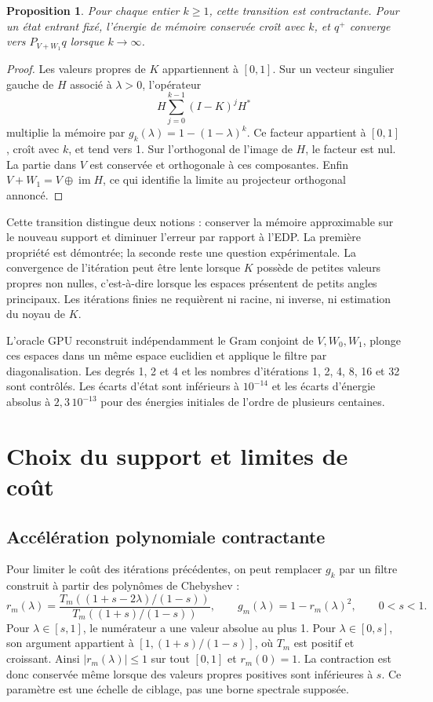 \documentclass[11pt,a4paper]{article}
\newtheorem{proposition}{Proposition}
\begin{document}
\begin{proposition}
Pour chaque entier $k\geq1$, cette transition est contractante.
Pour un état entrant fixé, l'énergie de mémoire conservée croît avec
$k$, et $q^+$ converge vers $P_{V+W_1}q$ lorsque $k\to\infty$.
\end{proposition}
\begin{proof}
Les valeurs propres de $K$ appartiennent à $[0,1]$. Sur un vecteur
singulier gauche de $H$ associé à $\lambda>0$, l'opérateur
\[
 H\sum_{j=0}^{k-1}(I-K)^jH^*
\]
multiplie la mémoire par $g_k(\lambda)=1-(1-\lambda)^k$.
Ce facteur appartient à $[0,1]$, croît avec $k$, et tend vers 1.
Sur l'orthogonal de l'image de $H$, le facteur est nul.
La partie dans $V$ est conservée et orthogonale à ces composantes.
Enfin $V+W_1=V\mathbin{\oplus}\operatorname{im}H$, ce qui identifie
la limite au projecteur orthogonal annoncé.
\end{proof}

Cette transition distingue deux notions : conserver la mémoire
approximable sur le nouveau support et diminuer l'erreur par rapport à
l'EDP. La première propriété est démontrée; la seconde reste une question
expérimentale. La convergence de l'itération peut être lente lorsque
$K$ possède de petites valeurs propres non nulles, c'est-à-dire lorsque
les espaces présentent de petits angles principaux. Les itérations
finies ne requièrent ni racine, ni inverse, ni estimation du noyau de $K$.

L'oracle GPU reconstruit indépendamment le Gram conjoint de $V,W_0,W_1$,
plonge ces espaces dans un même espace euclidien et applique le filtre
par diagonalisation. Les degrés 1, 2 et 4 et les nombres d'itérations
1, 2, 4, 8, 16 et 32 sont contrôlés. Les écarts d'état sont inférieurs
à $10^{-14}$ et les écarts d'énergie absolus à $2{,}3\,10^{-13}$ pour
des énergies initiales de l'ordre de plusieurs centaines.

\section{Choix du support et limites de coût}
\subsection{Accélération polynomiale contractante}
Pour limiter le coût des itérations précédentes, on peut remplacer
$g_k$ par un filtre construit à partir des polynômes de Chebyshev :
\[
 r_m(\lambda)=\frac{T_m((1+s-2\lambda)/(1-s))}{T_m((1+s)/(1-s))},
 \qquad g_m(\lambda)=1-r_m(\lambda)^2,\qquad 0<s<1.
\]
Pour $\lambda\in[s,1]$, le numérateur a une valeur absolue au plus 1.
Pour $\lambda\in[0,s]$, son argument appartient à
$[1,(1+s)/(1-s)]$, où $T_m$ est positif et croissant. Ainsi
$|r_m(\lambda)|\leq1$ sur tout $[0,1]$ et $r_m(0)=1$.
La contraction est donc conservée même lorsque des valeurs propres
positives sont inférieures à $s$. Ce paramètre est une échelle de ciblage,
pas une borne spectrale supposée.
\end{document}
